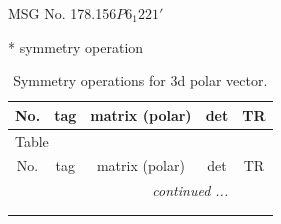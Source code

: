 \documentclass[fleqn,8pt]{jsarticle}
\begin{document}
\setcounter{MaxMatrixCols}{32}

\renewcommand{\tablename}{Table~}
\renewcommand{\figurename}{Figure~}
\begin{center}
\LARGE
MSG No. 178.156\quad$P6_{1}221'$
\end{center}
* symmetry operation
\renewcommand{\arraystretch}{1.3}
\begin{longtable}{ccccc}
\caption{Symmetry operations for 3d polar vector.}
 \\
 \hline \hline
No. & tag & matrix (polar) & det & TR \\ \hline \endfirsthead

\multicolumn{4}{l}{\tablename\ \thetable{}} \\
 \hline \hline
No. & tag & matrix (polar) & det & TR \\ \hline \endhead

 \hline \hline
\multicolumn{4}{r}{\footnotesize\it continued ...} \\ \endfoot

 \hline \hline
\multicolumn{4}{r}{} \\ \endlastfoot


\end{longtable}
\end{document}
